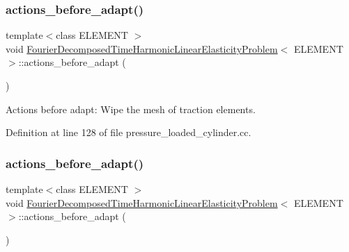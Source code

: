 \subsubsection{\texorpdfstring{actions\+\_\+before\+\_\+adapt()}{actions\_before\_adapt()}\hspace{0.1cm}{\footnotesize\ttfamily [1/2]}}
{\footnotesize\ttfamily template$<$class E\+L\+E\+M\+E\+NT $>$ \\
void \hyperlink{classFourierDecomposedTimeHarmonicLinearElasticityProblem}{Fourier\+Decomposed\+Time\+Harmonic\+Linear\+Elasticity\+Problem}$<$ E\+L\+E\+M\+E\+NT $>$\+::actions\+\_\+before\+\_\+adapt (\begin{DoxyParamCaption}{ }\end{DoxyParamCaption})\hspace{0.3cm}{\ttfamily [inline]}}



Actions before adapt\+: Wipe the mesh of traction elements. 



Definition at line 128 of file pressure\+\_\+loaded\+\_\+cylinder.\+cc.

\mbox{\label{classFourierDecomposedTimeHarmonicLinearElasticityProblem_a36fdaec8cffb1f6ac313515a86010d8d}} 
\subsubsection{\texorpdfstring{actions\+\_\+before\+\_\+adapt()}{actions\_before\_adapt()}\hspace{0.1cm}{\footnotesize\ttfamily [2/2]}}
{\footnotesize\ttfamily template$<$class E\+L\+E\+M\+E\+NT $>$ \\
void \hyperlink{classFourierDecomposedTimeHarmonicLinearElasticityProblem}{Fourier\+Decomposed\+Time\+Harmonic\+Linear\+Elasticity\+Problem}$<$ E\+L\+E\+M\+E\+NT $>$\+::actions\+\_\+before\+\_\+adapt (\begin{DoxyParamCaption}{ }\end{DoxyParamCaption})\hspace{0.3cm}{\ttfamily [inline]}}



